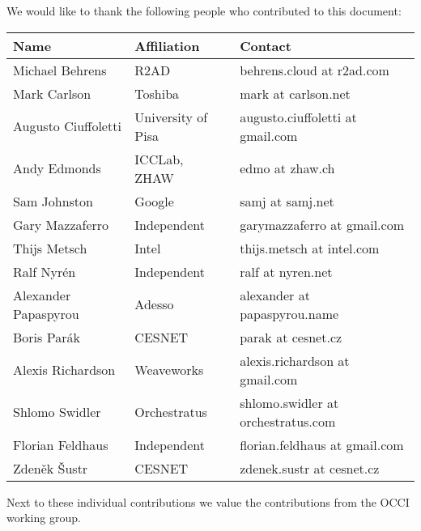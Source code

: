 
We would like to thank the following people who contributed to this
document:

\begin{tabular}{l|p{2in}|p{2in}}
Name & Affiliation & Contact \\
\hline
Michael Behrens & R2AD & behrens.cloud at r2ad.com \\
Mark Carlson & Toshiba & mark at carlson.net \\
Augusto Ciuffoletti & University of Pisa & augusto.ciuffoletti at gmail.com\\
Andy Edmonds & ICCLab, ZHAW & edmo at zhaw.ch \\
Sam Johnston & Google & samj at samj.net \\
Gary Mazzaferro & Independent &  garymazzaferro at gmail.com \\
Thijs Metsch & Intel & thijs.metsch at intel.com \\
Ralf Nyrén & Independent & ralf at nyren.net \\
Alexander Papaspyrou & Adesso & alexander at papaspyrou.name \\
Boris Parák & CESNET & parak at cesnet.cz \\
Alexis Richardson & Weaveworks & alexis.richardson at gmail.com \\
Shlomo Swidler & Orchestratus & shlomo.swidler at orchestratus.com \\
Florian Feldhaus & Independent & florian.feldhaus at gmail.com \\
Zden\v{e}k \v{S}ustr & CESNET & zdenek.sustr at cesnet.cz \\
\end{tabular}

Next to these individual contributions we value the contributions from
the OCCI working group.
